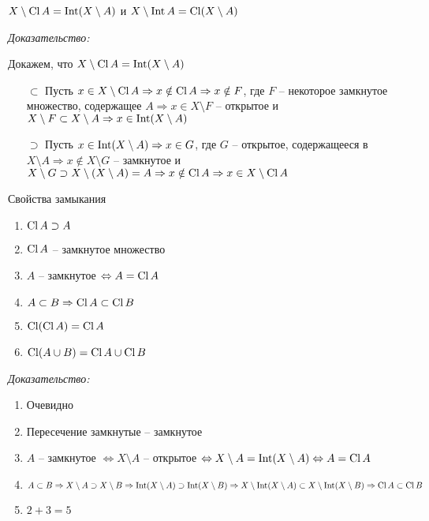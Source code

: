 \documentclass[12pt]{article}
\begin{document}
\begin{theo}{}
    $X \setminus \operatorname{Cl} A = \operatorname{Int} (X \setminus A)$ и $X \setminus \operatorname{Int} A = \operatorname{Cl} (X \setminus A)$
\end{theo}

\textit{Доказательство:}

Докажем, что $X \setminus \operatorname{Cl} A = \operatorname{Int} (X \setminus A)$

\begin{itemize}
    \item[$\subset$] Пусть $x \in X \setminus \operatorname{Cl} A \Rightarrow x \notin \operatorname{Cl} A \Rightarrow x \notin F$, где $F$ -- некоторое замкнутое множество, содержащее $A \Rightarrow x \in X \setminus F$ -- открытое и $X \setminus F \subset X \setminus A \Rightarrow x \in \operatorname{Int} (X \setminus A)$
    
    \item [$\supset$] Пусть $x \in \operatorname{Int} (X \setminus A) \Rightarrow x \in G$, где $G$ -- открытое, содержащееся в $X \setminus A \Rightarrow x \notin X \setminus G$ -- замкнутое и $X \setminus G \supset X \setminus (X \setminus A) = A \Rightarrow x \notin \operatorname{Cl} A \Rightarrow x \in X \setminus \operatorname{Cl} A$
\end{itemize}

\begin{theo}{Свойства замыкания}
    \begin{enumerate}
        \item $\operatorname{Cl} A \supset A$
        \item $\operatorname{Cl} A$ -- замкнутое множество
        \item $A$ -- замкнутое $\Leftrightarrow A = \operatorname{Cl} A$
        \item $A \subset B \Rightarrow \operatorname{Cl} A \subset \operatorname{Cl} B$
        \item $\operatorname{Cl}(\operatorname{Cl} A) = \operatorname{Cl} A$
        \item $\operatorname{Cl}(A \cup B) = \operatorname{Cl} A \cup \operatorname{Cl} B$
    \end{enumerate}
\end{theo}

\textit{Доказательство:}

\begin{enumerate}
    \item Очевидно
    \item Пересечение замкнутые -- замкнутое
    \item $A$ -- замкнутое $\Leftrightarrow X \setminus A$ -- открытое $\Leftrightarrow X \setminus A = \operatorname{Int} (X \setminus A) \Leftrightarrow A = \operatorname{Cl} A$
    \item $A \subset B \Rightarrow X \setminus A \supset X \setminus B \Rightarrow \operatorname{Int} (X \setminus A) \supset \operatorname{Int} (X \setminus B) \Rightarrow X \setminus \operatorname{Int} (X \setminus A) \subset X \setminus \operatorname{Int} (X \setminus B) \Rightarrow \operatorname{Cl} A \subset \operatorname{Cl} B$
    \item $2 + 3 = 5$
\end{enumerate}
\end{document}

